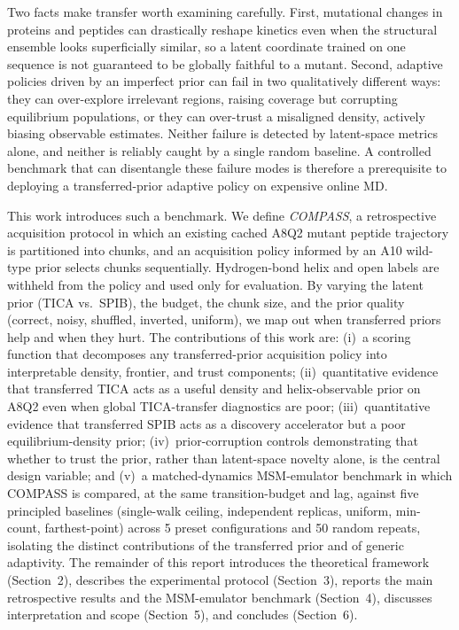 \documentclass[journal=jctcce,manuscript=article,layout=twocolumn]{achemso}
\begin{document}
Two facts make transfer worth examining carefully.
First, mutational changes in proteins and peptides can drastically reshape kinetics even when the structural ensemble looks superficially similar, so a latent coordinate trained on one sequence is not guaranteed to be globally faithful to a mutant.
Second, adaptive policies driven by an imperfect prior can fail in two qualitatively different ways: they can over-explore irrelevant regions, raising coverage but corrupting equilibrium populations, or they can over-trust a misaligned density, actively biasing observable estimates.
Neither failure is detected by latent-space metrics alone, and neither is reliably caught by a single random baseline.
A controlled benchmark that can disentangle these failure modes is therefore a prerequisite to deploying a transferred-prior adaptive policy on expensive online MD.

This work introduces such a benchmark.
We define \emph{COMPASS}, a retrospective acquisition protocol in which an existing cached A8Q2 mutant peptide trajectory is partitioned into chunks, and an acquisition policy informed by an A10 wild-type prior selects chunks sequentially.
Hydrogen-bond helix and open labels are withheld from the policy and used only for evaluation.
By varying the latent prior (TICA vs.\ SPIB), the budget, the chunk size, and the prior quality (correct, noisy, shuffled, inverted, uniform), we map out when transferred priors help and when they hurt.
The contributions of this work are: (i)~a scoring function that decomposes any transferred-prior acquisition policy into interpretable density, frontier, and trust components; (ii)~quantitative evidence that transferred TICA acts as a useful density and helix-observable prior on A8Q2 even when global TICA-transfer diagnostics are poor; (iii)~quantitative evidence that transferred SPIB acts as a discovery accelerator but a poor equilibrium-density prior; (iv)~prior-corruption controls demonstrating that whether to trust the prior, rather than latent-space novelty alone, is the central design variable; and (v)~a matched-dynamics MSM-emulator benchmark in which COMPASS is compared, at the same transition-budget and lag, against five principled baselines (single-walk ceiling, independent replicas, uniform, min-count, farthest-point) across 5 preset configurations and 50 random repeats, isolating the distinct contributions of the transferred prior and of generic adaptivity.
The remainder of this report introduces the theoretical framework (Section~2), describes the experimental protocol (Section~3), reports the main retrospective results and the MSM-emulator benchmark (Section~4), discusses interpretation and scope (Section~5), and concludes (Section~6).
\end{document}
